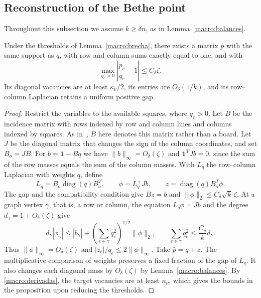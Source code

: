 \subsection{Reconstruction of the Bethe point}\label{macro:reconstruccion}
Throughout this subsection we assume $k\ge\delta n$, as in Lemma~\ref{macro:balances}.

\begin{proposicion}\label{macro:reequilibrado}
Under the thresholds of Lemma~\ref{macro:brecha}, there exists a matrix $\bar p$ with the same
support as $q$, with row and column sums exactly equal to one, and with
\[
 \max_{q_e>0}\left|\frac{\bar p_e}{q_e}-1\right|\le C_\delta\zeta .
\]
Its diagonal vacancies are at least $\kappa_\nu/2$, its entries are $O_\delta(1/k)$, and its
row--column Laplacian retains a uniform positive gap.
\end{proposicion}
\begin{proof}
Restrict the variables to the available squares, where $q_e>0$. Let $B$ be the incidence matrix
with rows indexed by row and column lines and columns indexed by squares. As
in~\cite[Section~6.1]{pred}, $B$ here denotes this matrix rather than a board. Let $J$ be the
diagonal matrix that changes the sign of the column coordinates, and set $B_o=JB$. For
$b=\mathbf1-Bq$ we have $\|b\|_\infty=O_\delta(\zeta)$ and $\mathbf1^TJb=0$, since the sum of the
row masses equals the sum of the column masses. With $L_q$ the row--column Laplacian with weights
$q$, define
\[
 L_q=B_o\operatorname{diag}(q)B_o^T,\qquad
 \phi=L_q^+Jb,\qquad z=\operatorname{diag}(q)B_o^T\phi .
\]
The gap and the compatibility condition give $Bz=b$ and $\|\phi\|_2\le C_\delta\sqrt{k}\,\zeta$.
At a graph vertex $\gamma$, that is, a row or column, the equation $L_q\phi=Jb$ and the degree
$d_\gamma=1+O_\delta(\zeta)$ give
\[
 d_\gamma|\phi_\gamma|\le |b_\gamma|+
 \left(\sum_{e\in\gamma}q_e^2\right)^{1/2}\|\phi\|_2,
 \qquad \sum_{e\in\gamma}q_e^2\le \frac{C_\delta}{k}d_\gamma .
\]
Thus $\|\phi\|_\infty=O_\delta(\zeta)$ and $|z_e|/q_e\le2\|\phi\|_\infty$. Take $\bar p=q+z$. The
multiplicative comparison of weights preserves a fixed fraction of the gap of $L_q$. It also changes
each diagonal mass by $O_\delta(\zeta)$ by Lemma~\ref{macro:balances}. By \eqref{macro:derivadas},
the target vacancies are at least $\kappa_\nu$, which gives the bounds in the proposition upon
reducing the thresholds.
\end{proof}

